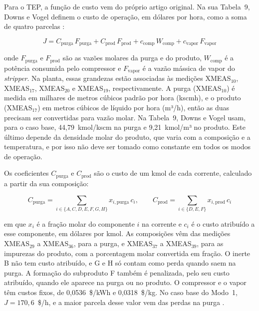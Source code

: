 Para o TEP, a função de custo vem do próprio artigo original. Na sua Tabela~9, Downs e Vogel definem o custo de operação, em dólares por hora, como a soma de quatro parcelas \cite{DOWNS1993}:

\begin{equation}
	J = C_{\mathrm{purga}}\,F_{\mathrm{purga}} + C_{\mathrm{prod}}\,F_{\mathrm{prod}} + c_{\mathrm{comp}}\,W_{\mathrm{comp}} + c_{\mathrm{vapor}}\,F_{\mathrm{vapor}}
	\label{eq:tep_cost}
\end{equation}

\noindent onde $F_{\mathrm{purga}}$ e $F_{\mathrm{prod}}$ são as vazões molares da purga e do produto, $W_{\mathrm{comp}}$ é a potência consumida pelo compressor e $F_{\mathrm{vapor}}$ é a vazão mássica de vapor do \textit{stripper}. Na planta, essas grandezas estão associadas às medições XMEAS$_{10}$, XMEAS$_{17}$, XMEAS$_{20}$ e XMEAS$_{19}$, respectivamente. A purga (XMEAS$_{10}$) é medida em milhares de metros cúbicos padrão por hora (kscmh), e o produto (XMEAS$_{17}$) em metros cúbicos de líquido por hora (m³/h), então as duas precisam ser convertidas para vazão molar. Na Tabela~9, Downs e Vogel usam, para o caso base, 44,79~kmol/kscm na purga e 9,21~kmol/m³ no produto. Este último depende da densidade molar do produto, que varia com a composição e a temperatura, e por isso não deve ser tomado como constante em todos os modos de operação.

Os coeficientes $C_{\mathrm{purga}}$ e $C_{\mathrm{prod}}$ são o custo de um kmol de cada corrente, calculado a partir da sua composição:

\begin{equation}
	C_{\mathrm{purga}} = \sum_{i \in \{A,C,D,E,F,G,H\}} x_{i,\mathrm{purga}}\, c_i, \qquad C_{\mathrm{prod}} = \sum_{i \in \{D,E,F\}} x_{i,\mathrm{prod}}\, c_i
	\label{eq:tep_cost_coef}
\end{equation}

\noindent em que $x_i$ é a fração molar do componente $i$ na corrente e $c_i$ é o custo atribuído a esse componente, em dólares por kmol. As composições vêm das medições XMEAS$_{29}$ a XMEAS$_{36}$, para a purga, e XMEAS$_{37}$ a XMEAS$_{39}$, para as impurezas do produto, com a porcentagem molar convertida em fração. O inerte B não tem custo atribuído, e G e H só contam como perda quando saem na purga. A formação do subproduto F também é penalizada, pelo seu custo atribuído, quando ele aparece na purga ou no produto. O compressor e o vapor têm custos fixos, de 0,0536~\$/kWh e 0,0318~\$/kg. No caso base do Modo~1, $J = 170{,}6$~\$/h, e a maior parcela desse valor vem das perdas na purga \cite{DOWNS1993}.

